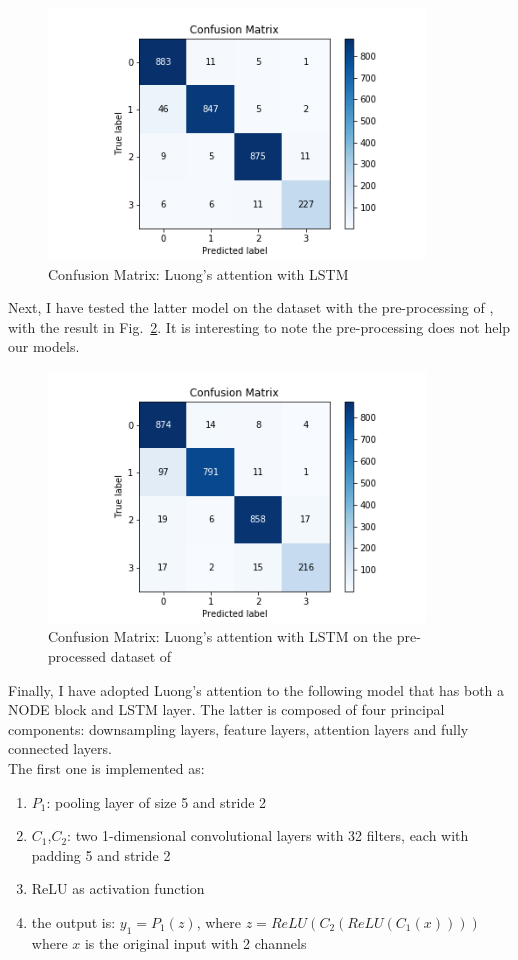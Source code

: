 \documentclass[LaM,binding=0.6cm]{sapthesis}
\begin{document}
\begin{figure}[H]  \centering
    \includegraphics[width=100mm,scale=0.7]{lstmat2}
    \caption{Confusion Matrix: Luong's attention with LSTM}
    \label{fig:lstmat2}
\end{figure}
Next, I have tested the latter model on the dataset with the pre-processing of \cite{cnnfazeli}, with the result in Fig.~\ref{fig:lstmatcnn}. It is interesting to note the pre-processing does not help our models.
\begin{figure}[H]  \centering
    \includegraphics[width=100mm,scale=0.7]{lstmatcnn}
    \caption{Confusion Matrix: Luong's attention with LSTM on the pre-processed dataset of \cite{cnnfazeli}}
    \label{fig:lstmatcnn}
\end{figure}
Finally, I have adopted Luong's attention to the following model that has both a NODE block and LSTM layer. The latter is composed of four principal components: downsampling layers, feature layers, attention layers and fully connected layers.\\The first one is implemented as:
\begin{enumerate}
\item $P_1$: pooling layer of size 5 and stride 2
\item $C_1$,$C_2$: two 1-dimensional convolutional layers with 32 filters, each with padding 5 and stride 2
\item ReLU as activation function
\item the output is: $y_1=P_1(z)$, where $z=ReLU(C_2(ReLU(C_1(x))))$ where $x$ is the original input with 2 channels
\end{enumerate}
\end{document}
